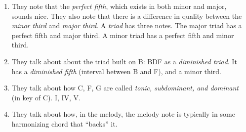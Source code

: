 \documentclass[11pt, oneside]{amsart}
\renewcommand{\define}[1]{\emph{#1}}
\newcommand{\7}{$^7$}
\begin{document}
\begin{enumerate}
  \item They note that the \define{perfect fifth}, which exists in both
  minor and major, sounds nice. They also note that there is a
  difference in quality between the \define{minor third} and
  \define{major third}. A \define{triad} has three notes. The major
  triad has a perfect fifth and major third. A minor triad has a perfect
  fifth and minor third.

  \item They talk about about the triad built on B: BDF as a
  \define{diminished triad}. It has a \define{diminished fifth}
  (interval between B and F), and a minor third.

  \item They talk about how C, F, G are called \define{tonic,
  subdominant, and dominant} (in key of C). I, IV, V.

  \item They talk about how, in the melody, the melody note is typically
  in some harmonizing chord that ``backs'' it.
\end{enumerate}
\end{document}
